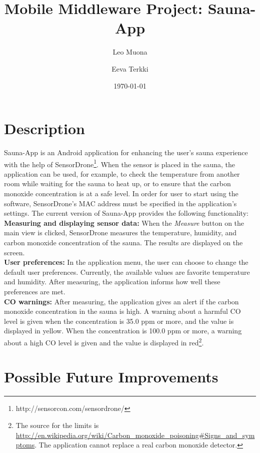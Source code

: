 \documentclass[11pt]{article}
\title{\textbf{Mobile Middleware Project: Sauna-App}}
\author{Leo Muona \and
		Eeva Terkki}
\date{\today}
\begin{document}
\maketitle
\thispagestyle{empty}

\section{Description}

Sauna-App is an Android application for enhancing the user's sauna experience with the help of SensorDrone\footnote{http://sensorcon.com/sensordrone/}. When the sensor is placed in the sauna, the application can be used, for example, to check the temperature from another room while waiting for the sauna to heat up, or to ensure that the carbon monoxide concentration is at a safe level. In order for user to start using the software, SensorDrone's MAC address must be specified in the application's settings. The current version of Sauna-App provides the following functionality:\\

\noindent\textbf{Measuring and displaying sensor data:} When the \textit{Measure} button on the main view is clicked, SensorDrone measures the temperature, humidity, and carbon monoxide concentration of the sauna. The results are displayed on the screen. \\

\noindent\textbf{User preferences:} In the application menu, the user can choose to change the default user preferences. Currently, the available values are favorite temperature and humidity. After measuring, the application informs how well these preferences are met. \\

\noindent\textbf{CO warnings:} After measuring, the application gives an alert if the carbon monoxide concentration in the sauna is high. A warning about a harmful CO level is given when the concentration is 35.0 ppm or more, and the value is displayed in yellow. When the concentration is 100.0 ppm or more, a warning about a high CO level is given and the value is displayed in red\footnote{The source for the limits is \url{http://en.wikipedia.org/wiki/Carbon_monoxide_poisoning\#Signs_and_symptoms}. The application cannot replace a real carbon monoxide detector.}.

\section{Possible Future Improvements}
\end{document}
